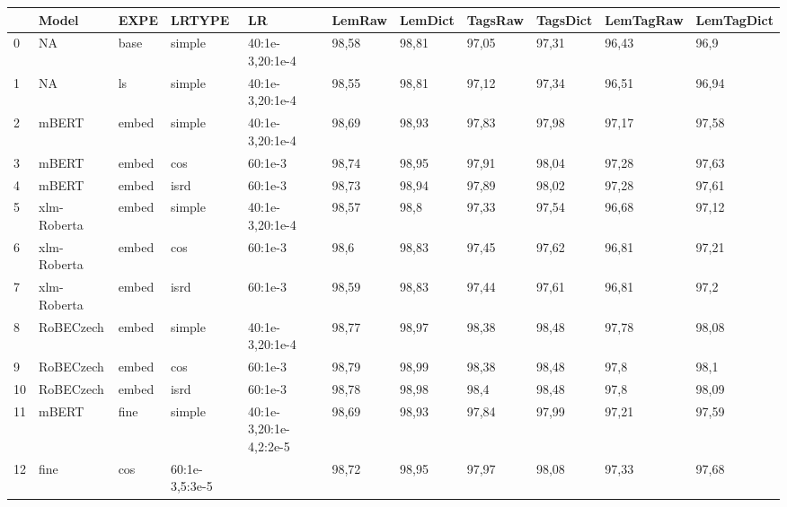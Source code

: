 \begin{table}[]
\begin{tabular}{lllllllllll}
\hline
   & Model       & EXPE  & LRTYPE         & LR                     & LemRaw & LemDict & TagsRaw & TagsDict & LemTagRaw & LemTagDict \\ \hline
0  & NA          & base  & simple         & 40:1e-3,20:1e-4        & 98,58  & 98,81   & 97,05   & 97,31    & 96,43     & 96,9       \\ \hline
1  & NA          & ls    & simple         & 40:1e-3,20:1e-4        & 98,55  & 98,81   & 97,12   & 97,34    & 96,51     & 96,94      \\ \hline
2  & mBERT       & embed & simple         & 40:1e-3,20:1e-4        & 98,69  & 98,93   & 97,83   & 97,98    & 97,17     & 97,58      \\ \hline
3  & mBERT       & embed & cos            & 60:1e-3                & 98,74  & 98,95   & 97,91   & 98,04    & 97,28     & 97,63      \\ \hline
4  & mBERT       & embed & isrd           & 60:1e-3                & 98,73  & 98,94   & 97,89   & 98,02    & 97,28     & 97,61      \\ \hline
5  & xlm-Roberta & embed & simple         & 40:1e-3,20:1e-4        & 98,57  & 98,8    & 97,33   & 97,54    & 96,68     & 97,12      \\ \hline
6  & xlm-Roberta & embed & cos            & 60:1e-3                & 98,6   & 98,83   & 97,45   & 97,62    & 96,81     & 97,21      \\ \hline
7  & xlm-Roberta & embed & isrd           & 60:1e-3                & 98,59  & 98,83   & 97,44   & 97,61    & 96,81     & 97,2       \\ \hline
8  & RoBECzech   & embed & simple         & 40:1e-3,20:1e-4        & 98,77  & 98,97   & 98,38   & 98,48    & 97,78     & 98,08      \\ \hline
9  & RoBECzech   & embed & cos            & 60:1e-3                & 98,79  & 98,99   & 98,38   & 98,48    & 97,8      & 98,1       \\ \hline
10 & RoBECzech   & embed & isrd           & 60:1e-3                & 98,78  & 98,98   & 98,4    & 98,48    & 97,8      & 98,09      \\ \hline
11 & mBERT       & fine  & simple         & 40:1e-3,20:1e-4,2:2e-5 & 98,69  & 98,93   & 97,84   & 97,99    & 97,21     & 97,59      \\ \hline
12 & fine        & cos   & 60:1e-3,5:3e-5 &                        & 98,72  & 98,95   & 97,97   & 98,08    & 97,33     & 97,68      \\ \hline

\end{tabular}
\end{table}
